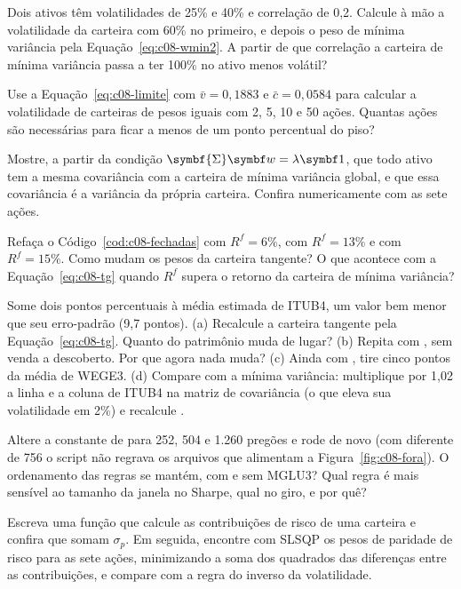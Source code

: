 \begin{exercicios}
  \item {} Dois ativos têm volatilidades de 25\% e 40\% e correlação de 0,2. Calcule à mão a volatilidade da carteira com 60\% no primeiro, e depois o peso de mínima variância pela Equação~\eqref{eq:c08-wmin2}. A partir de que correlação a carteira de mínima variância passa a ter 100\% no ativo menos volátil?
  \item {} Use a Equação~\eqref{eq:c08-limite} com $\bar v = 0,1883$ e $\bar c = 0,0584$ para calcular a volatilidade de carteiras de pesos iguais com 2, 5, 10 e 50 ações. Quantas ações são necessárias para ficar a menos de um ponto percentual do piso?
  \item\label{ex:c08-covmv}  Mostre, a partir da condição $\symbf{\Sigma}\vetor{w} = \lambda\vetor{1}$, que todo ativo tem a mesma covariância com a carteira de mínima variância global, e que essa covariância é a variância da própria carteira. Confira numericamente com as sete ações.
  \item {} Refaça o Código~\ref{cod:c08-fechadas} com $R^f = 6\%$, com $R^f = 13\%$ e com $R^f = 15\%$. Como mudam os pesos da carteira tangente? O que acontece com a Equação~\eqref{eq:c08-tg} quando $R^f$ supera o retorno da carteira de mínima variância?
  \item {} Some dois pontos percentuais à média estimada de ITUB4, um valor bem menor que seu erro-padrão (9,7 pontos). (a) Recalcule a carteira tangente pela Equação~\eqref{eq:c08-tg}. Quanto do patrimônio muda de lugar? (b) Repita com , sem venda a descoberto. Por que agora nada muda? (c) Ainda com , tire cinco pontos da média de WEGE3. (d) Compare com a mínima variância: multiplique por 1,02 a linha e a coluna de ITUB4 na matriz de covariância (o que eleva sua volatilidade em 2\%) e recalcule .
  \item {} Altere a constante  de  para 252, 504 e 1.260 pregões e rode de novo  (com  diferente de 756 o script não regrava os arquivos que alimentam a Figura~\ref{fig:c08-fora}). O ordenamento das regras se mantém, com e sem MGLU3? Qual regra é mais sensível ao tamanho da janela no Sharpe, qual no giro, e por quê?
  \item {} Escreva uma função que calcule as contribuições de risco de uma carteira e confira que somam $\sigma_p$. Em seguida, encontre com SLSQP os pesos de paridade de risco para as sete ações, minimizando a soma dos quadrados das diferenças entre as contribuições, e compare com a regra do inverso da volatilidade.

\end{exercicios}
